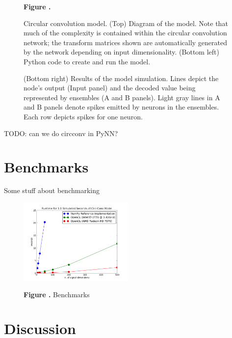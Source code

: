 \documentclass{frontiersSCNS}
\begin{document}
\begin{figure}
\begin{center}
\begin{minipage}{0.43\textwidth}
  \end{minipage}
\end{center}
 \textbf{\label{fig:lorenz} Figure .}{
   Circular convolution model. (Top) Diagram of the model.
   Note that much of the complexity is contained within the
   circular convolution network; the transform matrices shown
   are automatically generated by the network depending on
   input dimensionality.
   (Bottom left) Python code to create and run the model.

   (Bottom right) Results of the model simulation. Lines depict
   the node's output (Input panel) and the decoded value being represented
   by ensembles (A and B panels). Light gray lines in A and B panels denote
   spikes emitted by neurons in the ensembles. Each row depicts spikes
   for one neuron.}
\end{figure}

TODO: can we do circconv in PyNN?

\section{Benchmarks}

Some stuff about benchmarking

\begin{figure}
\begin{center}
  \includegraphics[width=0.5\textwidth]{benchmark}
\end{center}
 \textbf{\label{fig:benchmarks} Figure .}{
   Benchmarks}
\end{figure}

\section{Discussion}
\end{document}
